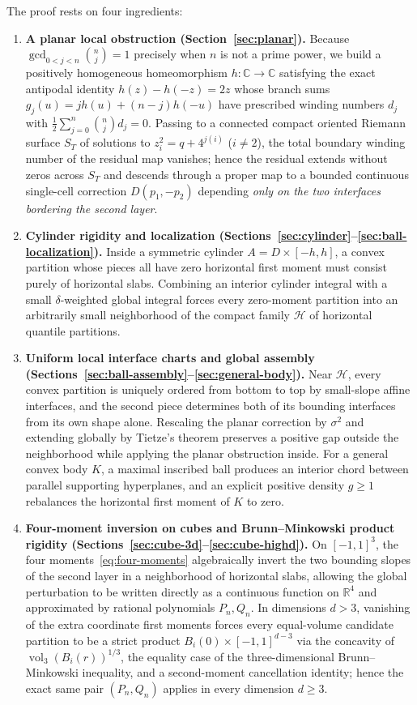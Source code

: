 \documentclass[11pt,a4paper]{amsart}
\numberwithin{equation}{section}
\theoremstyle{definition}
\newcommand{\R}{\mathbb{R}}
\newcommand{\C}{\mathbb{C}}
\newcommand{\Hcal}{\mathcal{H}}
\newcommand{\vol}{\operatorname{vol}}
\begin{document}
The proof rests on four ingredients:
\begin{enumerate}[label=(\arabic*)]
\item \textbf{A planar local obstruction (Section~\ref{sec:planar}).} Because $\gcd_{0<j<n}\binom{n}{j} = 1$ precisely when $n$ is not a prime power, we build a positively homogeneous homeomorphism $h : \C \to \C$ satisfying the exact antipodal identity $h(z) - h(-z) = 2z$ whose branch sums $g_j(u) = j h(u) + (n-j) h(-u)$ have prescribed winding numbers $d_j$ with $\frac12 \sum_{j=0}^n \binom{n}{j} d_j = 0$. Passing to a connected compact oriented Riemann surface $S_T$ of solutions to $z_i^2 = q + 4^{j(i)}$ ($i \ne 2$), the total boundary winding number of the residual map vanishes; hence the residual extends without zeros across $S_T$ and descends through a proper map to a bounded continuous single-cell correction $D(p_1, -p_2)$ depending \emph{only on the two interfaces bordering the second layer}.
\item \textbf{Cylinder rigidity and localization (Sections~\ref{sec:cylinder}--\ref{sec:ball-localization}).} Inside a symmetric cylinder $A = D \times [-h,h]$, a convex partition whose pieces all have zero horizontal first moment must consist purely of horizontal slabs. Combining an interior cylinder integral with a small $\delta$-weighted global integral forces every zero-moment partition into an arbitrarily small neighborhood of the compact family $\Hcal$ of horizontal quantile partitions.
\item \textbf{Uniform local interface charts and global assembly (Sections~\ref{sec:ball-assembly}--\ref{sec:general-body}).} Near $\Hcal$, every convex partition is uniquely ordered from bottom to top by small-slope affine interfaces, and the second piece determines both of its bounding interfaces from its own shape alone. Rescaling the planar correction by $\sigma^2$ and extending globally by Tietze's theorem preserves a positive gap outside the neighborhood while applying the planar obstruction inside. For a general convex body $K$, a maximal inscribed ball produces an interior chord between parallel supporting hyperplanes, and an explicit positive density $g \ge 1$ rebalances the horizontal first moment of $K$ to zero.
\item \textbf{Four-moment inversion on cubes and Brunn--Minkowski product rigidity (Sections~\ref{sec:cube-3d}--\ref{sec:cube-highd}).} On $[-1,1]^3$, the four moments~\eqref{eq:four-moments} algebraically invert the two bounding slopes of the second layer in a neighborhood of horizontal slabs, allowing the global perturbation to be written directly as a continuous function on $\R^4$ and approximated by rational polynomials $P_n, Q_n$. In dimensions $d > 3$, vanishing of the extra coordinate first moments forces every equal-volume candidate partition to be a strict product $B_i(0) \times [-1,1]^{d-3}$ via the concavity of $\vol_3(B_i(r))^{1/3}$, the equality case of the three-dimensional Brunn--Minkowski inequality, and a second-moment cancellation identity; hence the exact same pair $(P_n, Q_n)$ applies in every dimension $d \ge 3$.
\end{enumerate}
\end{document}
